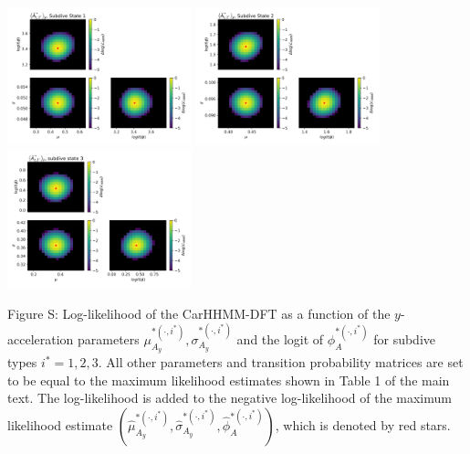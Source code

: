 \documentclass{article}
\begin{document}
        
        \begin{center}
        \includegraphics[width=2.1in]{../Plots/2019/20190902-182840-CATs_OB_1_0_267_CarHHMM2_fine-theta-likelihood-Ay-0.png}
        \includegraphics[width=2.1in]{../Plots/2019/20190902-182840-CATs_OB_1_0_267_CarHHMM2_fine-theta-likelihood-Ay-1.png}
        \includegraphics[width=2.1in]{../Plots/2019/20190902-182840-CATs_OB_1_0_267_CarHHMM2_fine-theta-likelihood-Ay-2.png}
        \end{center}
        
        \noindent Figure S: Log-likelihood of the CarHHMM-DFT as a function of the $y$-acceleration parameters $\mu_{A_y}^{*(\cdot,i^*)}, \sigma_{A_y}^{*(\cdot,i^*)}$ and the logit of $\phi_{A}^{*(\cdot,i^*)}$ for subdive types $i^* = 1,2,3$. All other parameters and transition probability matrices are set to be equal to the maximum likelihood estimates shown in Table 1 of the main text. The log-likelihood is added to the negative log-likelihood of the maximum likelihood estimate $(\hat \mu_{A_y}^{*(\cdot,i^*)}, \hat \sigma_{A_y}^{*(\cdot,i^*)}, \hat \phi_{A}^{*(\cdot,i^*)})$, which is denoted by red stars.
        \addtocounter{fignum}{1}
        
\end{document}
